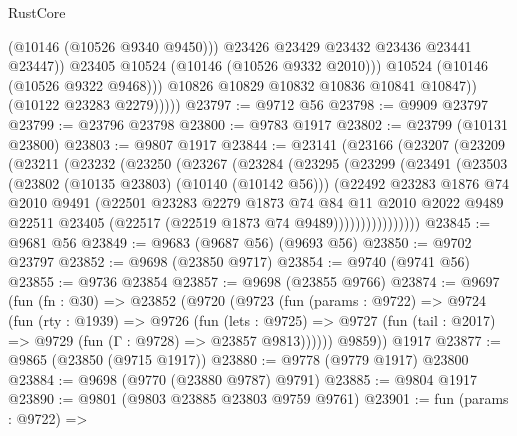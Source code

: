 \begin{lexlean}{RustCore}
\begin{coremodule}
                          (@10146 (@10526 @9340 @9450)))
                        @23426
                        @23429
                        @23432
                        @23436
                        @23441
                        @23447))
                    @23405
                    @10524
                    (@10146 (@10526 @9332 @2010)))
                  @10524
                  (@10146 (@10526 @9322 @9468)))
                @10826
                @10829
                @10832
                @10836
                @10841
                @10847))
            (@10122 @23283 @2279)))))
@23797 := @9712 @56
@23798 := @9909 @23797
@23799 := @23796 @23798
@23800 := @9783 @1917
@23802 := @23799 (@10131 @23800)
@23803 := @9807 @1917
@23844 := @23141
    (@23166
      (@23207
        (@23209
          (@23211
            (@23232
              (@23250
                (@23267
                  (@23284
                    (@23295
                      (@23299
                        (@23491
                          (@23503
                            (@23802 (@10135 @23803) (@10140 (@10142 @56)))
                            (@22492
                              @23283
                              @1876
                              @74
                              @2010
                              @9491
                              (@22501
                                @23283
                                @2279
                                @1873
                                @74
                                @84
                                @11
                                @2010
                                @2022
                                @9489
                                @22511
                                @23405
                                (@22517 (@22519 @1873 @74 @9489))))))))))))))))
@23845 := @9681 @56
@23849 := @9683 (@9687 @56) (@9693 @56)
@23850 := @9702 @23797
@23852 := @9698 (@23850 @9717)
@23854 := @9740 (@9741 @56)
@23855 := @9736 @23854
@23857 := @9698 (@23855 @9766)
@23874 := @9697
    (fun (fn : @30) =>
    @23852
      (@9720
        (@9723
          (fun (params : @9722) =>
          @9724
            (fun (rty : @1939) =>
            @9726
              (fun (lets : @9725) =>
              @9727 (fun (tail : @2017) => @9729 (fun (Γ : @9728) => @23857 @9813))))))
        @9859))
    @1917
@23877 := @9865 (@23850 (@9715 @1917))
@23880 := @9778 (@9779 @1917) @23800
@23884 := @9698 (@9770 (@23880 @9787) @9791)
@23885 := @9804 @1917
@23890 := @9801 (@9803 @23885 @23803 @9759 @9761)
@23901 := fun (params : @9722) =>

\end{coremodule}
\end{lexlean}
